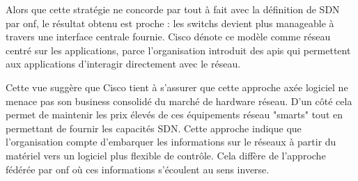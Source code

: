 Alors que cette stratégie ne concorde par tout à fait avec la définition de SDN par \gls{onf}, le résultat obtenu est proche : les switchs devient plus manageable à travers une interface centrale fournie. Cisco dénote ce modèle comme réseau centré sur les applications, parce l'organisation introduit des \glspl{api} qui permettent aux applications d'interagir directement avec le réseau. \cite{CiscoSDNONE}




Cette vue suggère que Cisco tient à s'assurer que cette approche axée logiciel ne menace pas son business consolidé du marché de hardware réseau. D'un côté cela permet de maintenir les prix élevés de ces équipements réseau "smarts" tout en permettant de fournir les capacités SDN. Cette approche indique que l'organisation compte d'embarquer les informations sur le réseaux à partir du matériel vers un logiciel plus flexible de contrôle. Cela diffère de l'approche fédérée par \gls{onf} où ces informations s'écoulent au sens inverse. 


